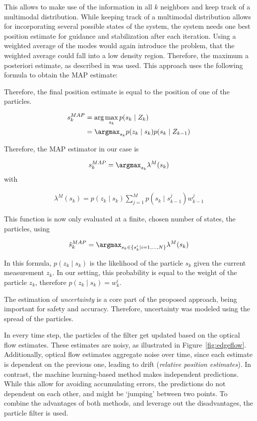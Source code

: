 This allows to make use of the information in all $k$ neighbors and
keep track of a multimodal distribution. While keeping track of a
multimodal distribution allows for incorporating several possible
states of the system, the system needs one best position estimate for guidance and stabilization after each iteration. Using a weighted average of the modes would again introduce the
problem, that the weighted average could fall into a low density
region. Therefore, the maximum a posteriori estimate, as described in
\cite{driessen2008map} was used. This approach uses the following
formula to obtain the MAP estimate:

Therefore, the final position estimate is equal to the position of one
of the particles.

\begin{align}
  s_k^{MAP}  &= \text{arg}\max_{s_k}{p(s_k \mid Z_k)}\\
             &= \argmax_{s_k}{p(z_k \mid s_k) p(s_k \mid Z_{k-1})} 
\end{align}

Therefore, the MAP estimator in our case is

\begin{align}
s_k^{MAP} = \argmax_{s_k} \lambda^M(s_k)
\end{align}
with

\begin{align}
\lambda^M(s_k) = p(z_k \mid s_k) \sum_{j=1}^Mp(s_k \mid s_{k-1}^j)w^j_{k-1}
\end{align}

This function is now only evaluated at a finite, chosen number of
states, the particles, using

\begin{align}
\hat{s}_k^{MAP} = \argmax_{s_k \in \{s_k^i \mid i=1,\ldots,N\}} \lambda^M(s_k)
\end{align}

In this formula, $p(z_k \mid s_k)$ is the likelihood of the particle
$s_k$ given the current measurement $z_k$. In our setting, this
probability is equal to the weight of the particle $z_k$, therefore
$p(z_k \mid s_k) = w^i_k$.

The estimation of \emph{uncertainty} is a core part of the proposed
approach, being important for safety and accuracy. Therefore,
uncertainty was modeled using the spread of the particles.

In every time step, the particles of the filter get updated based on
the optical flow estimates. These estimates are noisy, as illustrated
in Figure~\ref{fig:edgeflow}. Additionally, optical flow estimates
aggregate noise over time, since each estimate is dependent on the
previous one, leading to drift (\emph{relative position
  estimates}). In contrast, the machine learning-based method makes
independent predictions. While this allow for avoiding accumulating
errors, the predictions do not dependent on each other, and might be
`jumping' between two points. To combine the advantages of both
methods, and leverage out the disadvantages, the particle filter is
used.

